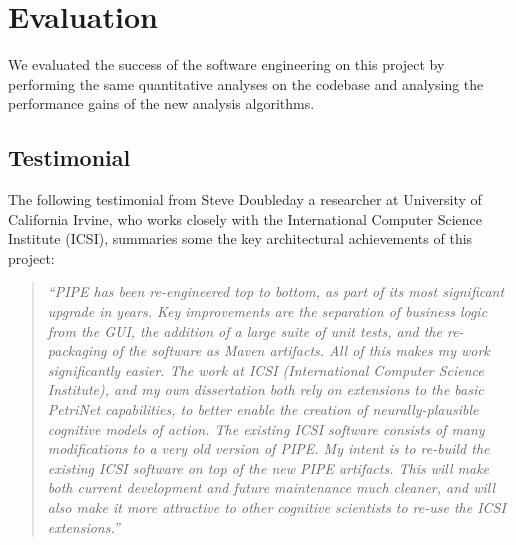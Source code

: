 \section{Evaluation}
We evaluated the success of the software engineering on this project by performing the same quantitative analyses on the codebase and analysing the performance gains of the new analysis algorithms.






\subsection{Testimonial}
The following testimonial from Steve Doubleday a researcher at University of California Irvine, who works closely with the International Computer Science Institute (ICSI), summaries some the key architectural achievements of this project:

\begin{quote}
\singlespacing
    \textit{``PIPE has been re-engineered top to bottom, as part of its most significant upgrade in years. Key improvements are the separation of business logic from the GUI, the addition of a large suite of unit tests, and the re-packaging of the software as Maven artifacts.  All of this makes my work significantly easier. The work at ICSI (International Computer Science Institute), and my own dissertation both rely on extensions to the basic PetriNet capabilities, to better enable the creation of neurally-plausible cognitive models of action. The existing ICSI software consists of many modifications to a very old version of PIPE. My intent is to re-build the existing ICSI software on top of the new PIPE artifacts. This will make both current development and future maintenance much cleaner, and will also make it more attractive to other cognitive scientists to re-use the ICSI extensions.''}
\end{quote}
